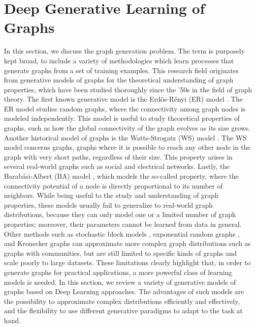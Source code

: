 \section{Deep Generative Learning of Graphs}
In this section, we discuss the graph generation problem. The term  is purposely kept broad, to include a variety of methodologies which learn processes that generate graphs from a set of training examples. This research field originates from generative models of graphs for the theoretical understanding of graph properties, which have been studied thoroughly since the '50s in the field of graph theory. The first known generative model is the  Erd\"{o}s-R\'{e}nyi (ER) model \cite{erdos1959randomgraphs}. The ER model studies random graphs, where the connectivity among graph nodes is modeled independently. This model is useful to study theoretical properties of graphs, such as how the global connectivity of the graph evolves as its size grows. Another historical model of graphs is the  Watts-Strogatz (WS)  model \cite{watts1998smallworld}. The WS model concerns  graphs, \ie graphs where it is possible to reach any other node in the graph with very short paths, regardless of their size. This property arises in several real-world graphs such as social and electrical networks. Lastly, the Barab{\'a}si-Albert (BA) model \cite{barabasi1999prefatt}, which models the so-called  property, where the connectivity potential of a node is directly proportional to its number of neighbors. While being useful to the study and understanding of graph properties, these models usually fail to generalize to real-world graph distributions, because they can only model one or a limited number of graph properties; moreover, their parameters cannot be learned from data in general. Other methods such as stochastic block models \citep{airoldi2008mixedstochasticblock}, exponential random graphs \citep{robins2007exponentialrandomgraphs}, and Kronecker graphs \citep{leskovec2010kronecker} can approximate more complex graph distributions such as graphs with communities, but are still limited to specific kinds of graphs and scale poorly to large datasets.
These limitations clearly highlight that, in order to generate graphs for practical applications, a more powerful class of learning models is needed. In this section, we review a variety of generative models of graphs based on Deep Learning approaches. The advantages of such models are the possibility to approximate complex distributions efficiently and effectively, and the flexibility to use different generative paradigms to adapt to the task at hand.

